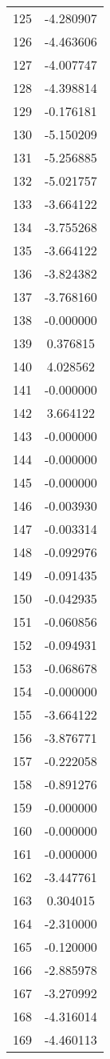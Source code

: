 \documentclass[12pt]{article}
\begin{document}
\begin{longtable}{@{}cc@{}}
125 & -4.280907 \\
126 & -4.463606 \\
127 & -4.007747 \\
128 & -4.398814 \\
129 & -0.176181 \\
130 & -5.150209 \\
131 & -5.256885 \\
132 & -5.021757 \\
133 & -3.664122 \\
134 & -3.755268 \\
135 & -3.664122 \\
136 & -3.824382 \\
137 & -3.768160 \\
138 & -0.000000 \\
139 & 0.376815 \\
140 & 4.028562 \\
141 & -0.000000 \\
142 & 3.664122 \\
143 & -0.000000 \\
144 & -0.000000 \\
145 & -0.000000 \\
146 & -0.003930 \\
147 & -0.003314 \\
148 & -0.092976 \\
149 & -0.091435 \\
150 & -0.042935 \\
151 & -0.060856 \\
152 & -0.094931 \\
153 & -0.068678 \\
154 & -0.000000 \\
155 & -3.664122 \\
156 & -3.876771 \\
157 & -0.222058 \\
158 & -0.891276 \\
159 & -0.000000 \\
160 & -0.000000 \\
161 & -0.000000 \\
162 & -3.447761 \\
163 & 0.304015 \\
164 & -2.310000 \\
165 & -0.120000 \\
166 & -2.885978 \\
167 & -3.270992 \\
168 & -4.316014 \\
169 & -4.460113 \\

\end{longtable}
\end{document}
